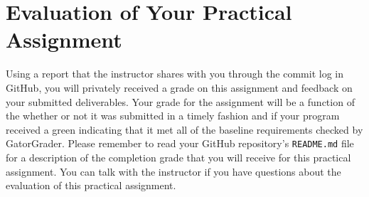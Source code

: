 \documentclass[11pt]{article}
\newcommand{\program}[1]{\lstinline{#1}}
\newcommand{\checkmark}{\ding{51}}
\begin{document}
\vspace*{-.2in}

\section*{Evaluation of Your Practical Assignment}

Using a report that the instructor shares with you through the commit log in
GitHub, you will privately received a grade on this assignment and feedback on
your submitted deliverables. Your grade for the assignment will be a function of
the whether or not it was submitted in a timely fashion and if your program
received a green \checkmark{} indicating that it met all of the baseline
requirements checked by GatorGrader.
%
Please remember to read your GitHub repository's \program{README.md} file for a
description of the completion grade that you will receive for this practical
assignment.
%
You can talk with the instructor if you have questions about the evaluation of
this practical assignment.


\end{document}
